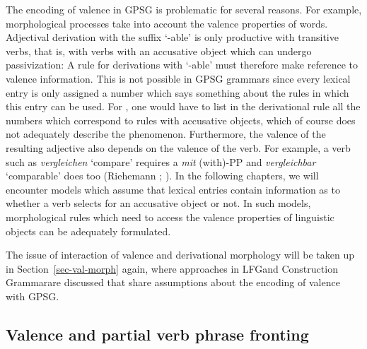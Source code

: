 The encoding of valence in GPSG is problematic for several reasons. For example, morphological processes take into account the valence properties of words. 
Adjectival derivation with the suffix  `-able' is only productive with transitive verbs,
that is, with verbs with an accusative object which can undergo passivization:
\eal\settowidth{}
\zl
A rule for derivations with  `-able' must therefore make reference to valence
information. This is not possible in GPSG grammars since every lexical entry is only assigned a
number which says something about the rules in which this entry can be used. For \bards, one would
have to list in the derivational rule all the numbers which correspond to rules with accusative
objects, which of course does not adequately describe the phenomenon. Furthermore, the valence of
the resulting adjective also depends on the valence of the verb. For example, a verb such as
\emph{vergleichen} `compare' requires a \emph{mit} (with)-PP and \emph{vergleichbar} `comparable'
does too (Riehemann \citeyear[, 54]{Riehemann93a}; \citeyear[]{Riehemann98a}).  In
the following chapters, we will encounter models which assume that lexical entries contain
information as to whether a verb selects for an accusative object or not. In such models,
morphological rules which need to access the valence properties of linguistic objects can be
adequately formulated.

The issue of interaction of valence and derivational morphology will be taken up in
Section~\ref{sec-val-morph} again, where approaches in LFG\indexlfg and Construction
Grammar\indexcxg are discussed that share assumptions about the encoding of valence with GPSG.

\subsection{Valence and partial verb phrase fronting}

